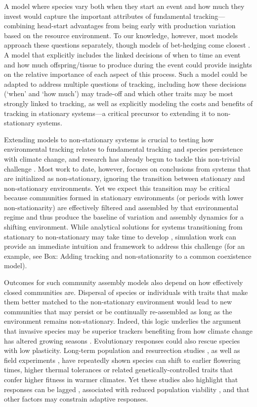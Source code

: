 \documentclass[11pt,letterpaper]{article}
\begin{document}
A model where species vary both when they start an event and how much they invest would capture the important attributes of fundamental tracking---combining head-start advantages from being early with production variation based on the resource environment. To our knowledge, however, most models approach these questions separately, though models of bet-hedging come closest \citep{Gourbiere2009,tufto2015}. A model that explicitly includes the linked decisions of when to time an event and how much offspring/tissue to produce during the event could provide insights on the relative importance of each aspect of this process. Such a model could be adapted to address multiple questions of tracking, including how these decisions (`when' and `how much') may trade-off and which other traits may be most strongly linked to tracking, as well as explicitly modeling the costs and benefits of tracking in stationary systems---a critical precursor to extending it to non-stationary systems. 

Extending models to non-stationary systems is crucial to testing how environmental tracking relates to fundamental tracking and species persistence with climate change, and research has already begun to tackle this non-trivial challenge \citep{chessonnonstat,legault2019,volkerass}. Most work to date, however, focuses on conclusions from systems that are initialized as non-stationary, ignoring the transition between stationary and non-stationary environments. Yet we expect this transition may be critical because communities formed in stationary environments (or periods with lower non-stationarity) are effectively filtered and assembled by that environmental regime and thus produce the baseline of variation and assembly dynamics for a shifting environment. While analytical solutions for systems transitioning from stationary to non-stationary may take time to develop \citep{chessonnonstat}, simulation work can provide an immediate intuition and framework to address this challenge (for an example, see Box: Adding tracking and non-stationarity to a common coexistence model). 

Outcomes for such community assembly models also depend on how effectively closed communities are. Dispersal of species or individuals with traits that make them better matched to the non-stationary environment would lead to new communities that may persist or be continually re-assembled as long as the environment remains non-stationary. Indeed, this logic underlies the argument that invasive species may be superior trackers benefiting from how climate change has altered growing seasons \citep{Willis:2010al,wolkovich:2010fee}. Evolutionary responses could also rescue species with low plasticity. Long-term population \citep[e.g.,][]{colautti2017} and resurrection studies \citep{wilczek2014,yousey2018}, as well as field experiments \citep{colautti2017,arab2019}, have repeatedly shown species can shift to earlier flowering times, higher thermal tolerances or related genetically-controlled traits that confer higher fitness in warmer climates. Yet these studies also highlight that responses can be lagged \citep[e.g.,][]{wilczek2014}, associated with reduced population viability \citep[e.g.,][]{colautti2017}, and that other factors may constrain adaptive responses.
\end{document}
